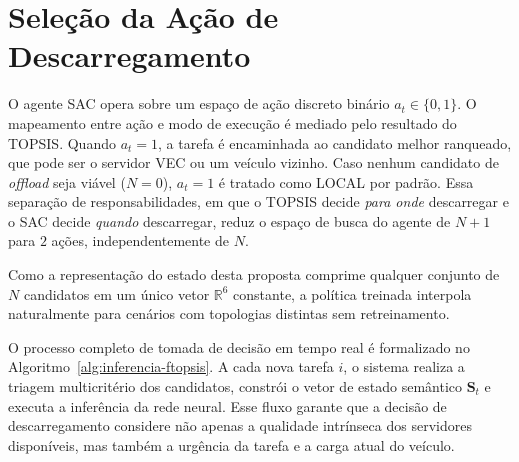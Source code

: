 \section*{Seleção da Ação de Descarregamento}
O agente \gls{SAC} opera sobre um espaço de ação discreto binário $a_t \in \{0, 1\}$. O mapeamento entre ação e modo de execução é mediado pelo resultado do \gls{TOPSIS}. Quando $a_t = 1$, a tarefa é encaminhada ao candidato melhor ranqueado, que pode ser o servidor \gls{VEC} ou um veículo vizinho. Caso nenhum candidato de \textit{offload} seja viável ($N = 0$), $a_t = 1$ é tratado como \textsc{LOCAL} por padrão. Essa separação de responsabilidades, em que o \gls{TOPSIS} decide \textit{para onde} descarregar e o \gls{SAC} decide \textit{quando} descarregar, reduz o espaço de busca do agente de $N+1$ para $2$ ações, independentemente de $N$.



Como a representação do estado desta proposta comprime qualquer conjunto de $N$ candidatos em um único vetor $\mathbb{R}^6$ constante, a política treinada interpola naturalmente para cenários com topologias distintas sem retreinamento. 

O processo completo de tomada de decisão em tempo real é formalizado no Algoritmo~\ref{alg:inferencia-ftopsis}. A cada nova tarefa $i$, o sistema realiza a triagem multicritério dos candidatos, constrói o vetor de estado semântico $\mathbf{S}_t$ e executa a inferência da rede neural. Esse fluxo garante que a decisão de descarregamento considere não apenas a qualidade intrínseca dos servidores disponíveis, mas também a urgência da tarefa e a carga atual do veículo.

